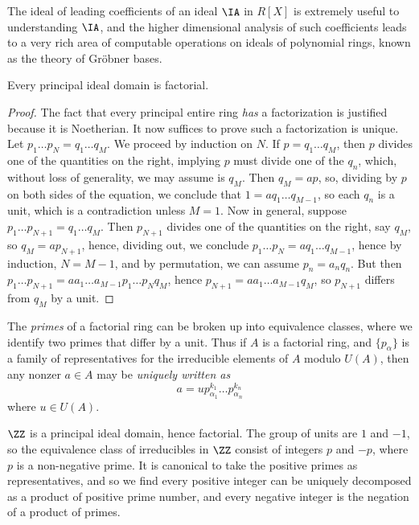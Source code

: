 The ideal of leading coefficients of an ideal $\IA$ in $R[X]$ is extremely useful to understanding $\IA$, and the higher dimensional analysis of such coefficients leads to a very rich area of computable operations on ideals of polynomial rings, known as the theory of Gr\"{o}bner bases.

\begin{theorem}
    Every principal ideal domain is factorial.
\end{theorem}
\begin{proof}
    The fact that every principal entire ring {\it has} a factorization is justified because it is Noetherian. It now suffices to prove such a factorization is unique. Let $p_1 \dots p_N = q_1 \dots q_M$. We proceed by induction on $N$. If $p = q_1 \dots q_M$, then $p$ divides one of the quantities on the right, implying $p$ must divide one of the $q_n$, which, without loss of generality, we may assume is $q_M$. Then $q_M = ap$, so, dividing by $p$ on both sides of the equation, we conclude that $1 = a q_1 \dots q_{M-1}$, so each $q_n$ is a unit, which is a contradiction unless $M = 1$. Now in general, suppose $p_1 \dots p_{N+1} = q_1 \dots q_M$. Then $p_{N+1}$ divides one of the quantities on the right, say $q_M$, so $q_M = ap_{N+1}$, hence, dividing out, we conclude $p_1 \dots p_N = a q_1 \dots q_{M-1}$, hence by induction, $N = M-1$, and by permutation, we can assume $p_n = a_nq_n$. But then $p_1 \dots p_{N+1} = aa_1 \dots a_{M-1} p_1 \dots p_N q_M$, hence $p_{N+1} = aa_1 \dots a_{M-1} q_M$, so $p_{N+1}$ differs from $q_M$ by a unit.
\end{proof}

The {\it primes} of a factorial ring can be broken up into equivalence classes, where we identify two primes that differ by a unit. Thus if $A$ is a factorial ring, and $\{ p_\alpha \}$ is a family of representatives for the irreducible elements of $A$ modulo $U(A)$, then any nonzer $a \in A$ may be \emph{uniquely written as}
%
\[ a = u p_{\alpha_1}^{k_1} \dots p_{\alpha_n}^{k_n} \]
%
where $u \in U(A)$.

\begin{example}
    $\ZZ$ is a principal ideal domain, hence factorial. The group of units are $1$ and $-1$, so the equivalence class of irreducibles in $\ZZ$ consist of integers $p$ and $-p$, where $p$ is a non-negative prime. It is canonical to take the positive primes as representatives, and so we find every positive integer can be uniquely decomposed as a product of positive prime number, and every negative integer is the negation of a product of primes.
\end{example}

